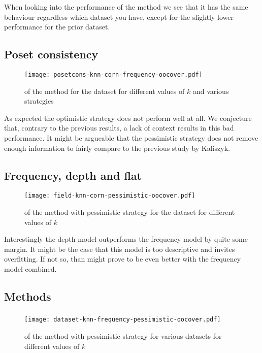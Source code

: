When looking into the performance of the \knn method we see that it has the same behaviour regardless which dataset you have, except for
the slightly lower performance for the prior dataset.

\subsection{Poset consistency}
\begin{figure}[H]
  \centering
  \texttt{[image: posetcons-knn-corn-frequency-oocover.pdf]}
  \caption{\oocover of the \knn method for the \corn dataset for different values of $k$ and various strategies}
\end{figure}

As expected the optimistic strategy does not perform well at all.
We conjecture that, contrary to the previous results, a lack of context results in this bad performance.
It might be argueable that the pessimistic strategy does not remove enough information to fairly compare to the previous study by
Kaliszyk. \cite{kaliszyk2014machine}

\subsection{Frequency, depth and flat}
\begin{figure}[H]
  \centering
  \texttt{[image: field-knn-corn-pessimistic-oocover.pdf]}
  \caption{\oocover of the \knn method with pessimistic strategy for the \corn dataset for different values of $k$}
\end{figure}

Interestingly the depth model outperforms the frequency model by quite some margin.
It might be the case that this model is too descriptive and invites overfitting.
If not so, than might prove to be even better with the frequency model combined.

\subsection{Methods}

\subsubsection{\knn}
\begin{figure}[H]
  \centering
  \texttt{[image: dataset-knn-frequency-pessimistic-oocover.pdf]}
  \caption{\oocover of the \knn method with pessimistic strategy for various datasets for different values of $k$}
\end{figure}

